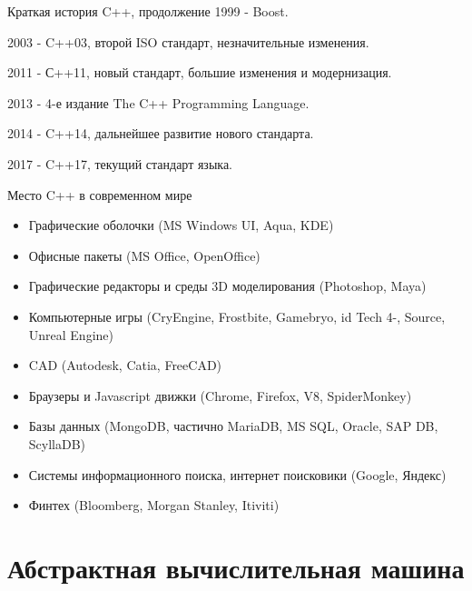 \documentclass[unknownkeysallowed,xcolor=table]{beamer}
\begin{document}
\begin{frame}{Краткая история C++, продолжение}
  1999 - Boost.

  2003 - C++03, второй ISO стандарт, незначительные изменения.

  2011 - С++11, новый стандарт, большие изменения и модернизация.

  2013 - 4-е издание The C++ Programming Language.

  2014 - C++14, дальнейшее развитие нового стандарта.

  2017 - C++17, текущий стандарт языка.
\end{frame}

\begin{frame}{Место C++ в современном мире}
  \begin{itemize}
    \item Графические оболочки (MS Windows UI, Aqua, KDE)
    \item Офисные пакеты (MS Office, OpenOffice)
    \item Графические редакторы и среды 3D моделирования (Photoshop, Maya)
    \item Компьютерные игры (CryEngine, Frostbite, Gamebryo, id Tech 4-, Source, Unreal Engine)
    \item CAD (Autodesk, Catia, FreeCAD)
    \item Браузеры и Javascript движки (Chrome, Firefox, V8, SpiderMonkey)
    \item Базы данных (MongoDB, частично MariaDB, MS SQL, Oracle, SAP DB, ScyllaDB)
    \item Системы информационного поиска, интернет поисковики (Google, Яндекс)
    \item Финтех (Bloomberg, Morgan Stanley, Itiviti)
  \end{itemize}
\end{frame}

\section{Абстрактная вычислительная машина}
\end{document}
